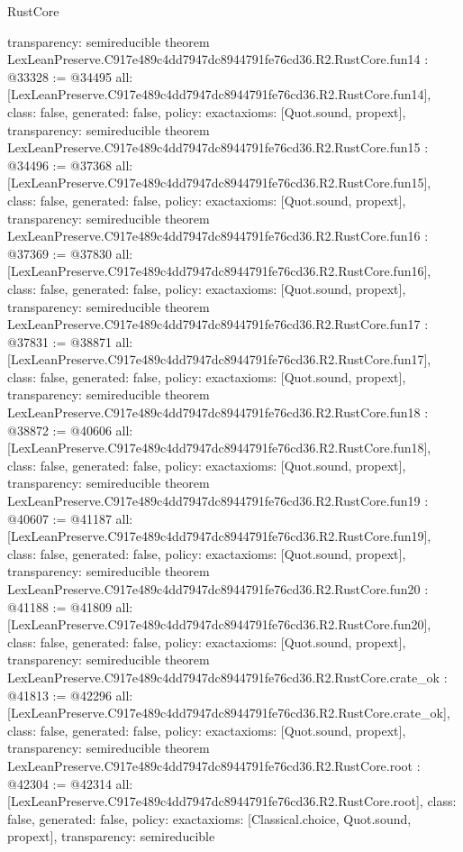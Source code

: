 \begin{lexlean}{RustCore}
\begin{coremodule}
{  transparency: semireducible
}
theorem LexLeanPreserve.C917e489c4dd7947dc8944791fe76cd36.R2.RustCore.fun14 : @33328 := @34495 {
  all: [LexLeanPreserve.C917e489c4dd7947dc8944791fe76cd36.R2.RustCore.fun14],
  class: false,
  generated: false,
  policy: exact{axioms: [Quot.sound, propext]},
  transparency: semireducible
}
theorem LexLeanPreserve.C917e489c4dd7947dc8944791fe76cd36.R2.RustCore.fun15 : @34496 := @37368 {
  all: [LexLeanPreserve.C917e489c4dd7947dc8944791fe76cd36.R2.RustCore.fun15],
  class: false,
  generated: false,
  policy: exact{axioms: [Quot.sound, propext]},
  transparency: semireducible
}
theorem LexLeanPreserve.C917e489c4dd7947dc8944791fe76cd36.R2.RustCore.fun16 : @37369 := @37830 {
  all: [LexLeanPreserve.C917e489c4dd7947dc8944791fe76cd36.R2.RustCore.fun16],
  class: false,
  generated: false,
  policy: exact{axioms: [Quot.sound, propext]},
  transparency: semireducible
}
theorem LexLeanPreserve.C917e489c4dd7947dc8944791fe76cd36.R2.RustCore.fun17 : @37831 := @38871 {
  all: [LexLeanPreserve.C917e489c4dd7947dc8944791fe76cd36.R2.RustCore.fun17],
  class: false,
  generated: false,
  policy: exact{axioms: [Quot.sound, propext]},
  transparency: semireducible
}
theorem LexLeanPreserve.C917e489c4dd7947dc8944791fe76cd36.R2.RustCore.fun18 : @38872 := @40606 {
  all: [LexLeanPreserve.C917e489c4dd7947dc8944791fe76cd36.R2.RustCore.fun18],
  class: false,
  generated: false,
  policy: exact{axioms: [Quot.sound, propext]},
  transparency: semireducible
}
theorem LexLeanPreserve.C917e489c4dd7947dc8944791fe76cd36.R2.RustCore.fun19 : @40607 := @41187 {
  all: [LexLeanPreserve.C917e489c4dd7947dc8944791fe76cd36.R2.RustCore.fun19],
  class: false,
  generated: false,
  policy: exact{axioms: [Quot.sound, propext]},
  transparency: semireducible
}
theorem LexLeanPreserve.C917e489c4dd7947dc8944791fe76cd36.R2.RustCore.fun20 : @41188 := @41809 {
  all: [LexLeanPreserve.C917e489c4dd7947dc8944791fe76cd36.R2.RustCore.fun20],
  class: false,
  generated: false,
  policy: exact{axioms: [Quot.sound, propext]},
  transparency: semireducible
}
theorem LexLeanPreserve.C917e489c4dd7947dc8944791fe76cd36.R2.RustCore.crate_ok : @41813 := @42296 {
  all: [LexLeanPreserve.C917e489c4dd7947dc8944791fe76cd36.R2.RustCore.crate_ok],
  class: false,
  generated: false,
  policy: exact{axioms: [Quot.sound, propext]},
  transparency: semireducible
}
theorem LexLeanPreserve.C917e489c4dd7947dc8944791fe76cd36.R2.RustCore.root : @42304 := @42314 {
  all: [LexLeanPreserve.C917e489c4dd7947dc8944791fe76cd36.R2.RustCore.root],
  class: false,
  generated: false,
  policy: exact{axioms: [Classical.choice, Quot.sound, propext]},
  transparency: semireducible
}


\end{coremodule}
\end{lexlean}
